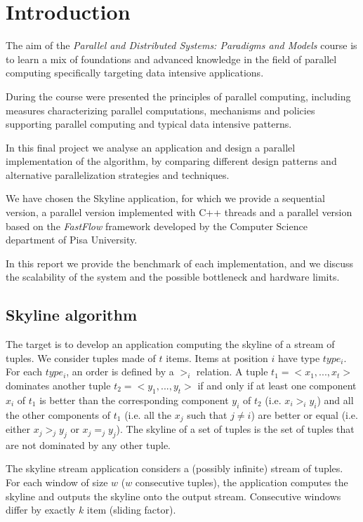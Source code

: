 \section{Introduction}
The aim of the \textit{Parallel and Distributed Systems: Paradigms and Models} course is to learn a mix of foundations and advanced knowledge in the field of parallel computing specifically targeting data intensive applications. 

During the course were presented the principles of parallel computing, including measures characterizing parallel computations, mechanisms and policies supporting parallel computing and typical data intensive patterns.

In this final project we analyse an application and design a parallel implementation of the algorithm, by comparing different design patterns and alternative parallelization strategies and techniques.

We have chosen the Skyline application, for which we provide a sequential version, a parallel version implemented with C++ threads and a parallel version based on the \textit{FastFlow} framework developed by the Computer Science department of Pisa University.

In this report we provide the benchmark of each implementation, and we discuss the scalability of the system and the possible bottleneck and hardware limits.

\subsection{Skyline algorithm}
The target is to develop an application computing the skyline of a stream of tuples. We consider tuples
made of $t$ items. Items at position $i$ have type $type_i$. For each $type_i$, an order is defined by a $>_i$ relation. A tuple $t_1 = <x_1, ... , x_t>$ dominates another tuple $t_2 = <y_1, ... , y_t>$ if and only if at least one component $x_i$ of $t_1$ is better than the corresponding component $y_i$ of $t_2$ (i.e. $x_i >_i y_i$) and all the other components of $t_1$ (i.e. all the $x_j$ such that $j \neq i$) are better or equal (i.e. either $x_j >_j y_j$ or $x_j =_j y_j$). The skyline of a set of tuples is the set of tuples that are not dominated by any other tuple.

The skyline stream application considers a (possibly infinite) stream of tuples. For each window of size $w$ ($w$ consecutive tuples), the application computes the skyline and outputs the skyline onto the output stream. Consecutive windows differ by exactly $k$ item (sliding factor).

